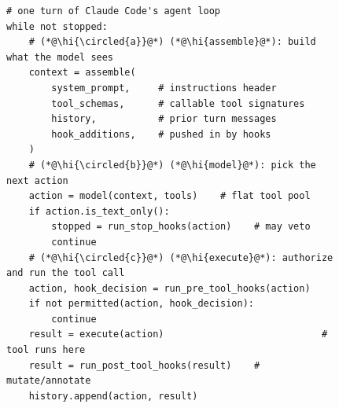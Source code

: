 \begin{figure}[!t]
  \centering
  \begin{minipage}[t]{0.58\textwidth}
    \vspace{0pt}
\begin{lstlisting}[style=agentloop]
# one turn of Claude Code's agent loop
while not stopped:
    # (*@\hi{\circled{a}}@*) (*@\hi{assemble}@*): build what the model sees
    context = assemble(
        system_prompt,     # instructions header
        tool_schemas,      # callable tool signatures
        history,           # prior turn messages
        hook_additions,    # pushed in by hooks
    )
    # (*@\hi{\circled{b}}@*) (*@\hi{model}@*): pick the next action
    action = model(context, tools)    # flat tool pool
    if action.is_text_only():
        stopped = run_stop_hooks(action)    # may veto
        continue
    # (*@\hi{\circled{c}}@*) (*@\hi{execute}@*): authorize and run the tool call
    action, hook_decision = run_pre_tool_hooks(action)  
    if not permitted(action, hook_decision):            
        continue
    result = execute(action)                            # tool runs here
    result = run_post_tool_hooks(result)    # mutate/annotate
    history.append(action, result)
\end{lstlisting}
    \vspace{4pt}


\end{minipage}
\end{figure}
